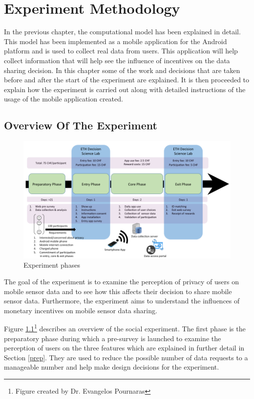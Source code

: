 \chapter{Experiment Methodology} \label{exp}

In the previous chapter, the computational model has been explained in detail. This model has been implemented as a mobile application for the Android platform and is used to collect real data from users. This application will help collect information that will help see the influence of incentives on the data sharing decision. In this chapter some of the work and decisions that are taken before and after the start of the experiment are explained. It is then proceeded to explain how the experiment is carried out along with detailed instructions of the usage of the mobile application created. 

\section{Overview Of The Experiment} \label{overview}
\begin{figure}[ht!]
\centering
\includegraphics[width=\textwidth,keepaspectratio]{./images/exp_phases}
\caption{Experiment phases}
\label{fig:exp_phases}
\end{figure}

The goal of the experiment is to examine the perception of privacy of users on mobile sensor data and to see how this affects their decision to share mobile sensor data. Furthermore, the experiment aims to understand the influences of monetary incentives on mobile sensor data sharing.

Figure \ref{fig:exp_phases}\footnote{Figure created by Dr. Evangelos Pournaras} describes an overview of the social experiment. The first phase is the preparatory phase during which a pre-survey is launched to examine the perception of users on the three features which are explained in further detail in Section \ref{prep}. They are used to reduce the possible number of data requests to a manageable number and help make design decisions for the experiment.

